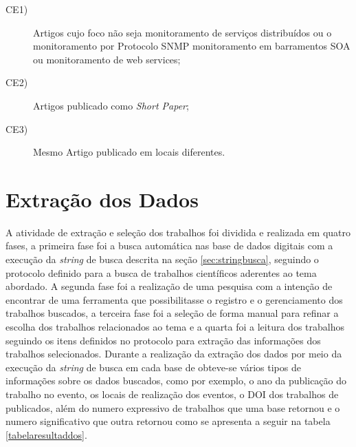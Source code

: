 \begin{description}
\item[CE1)]Artigos cujo foco não seja monitoramento de serviços distribuídos ou o monitoramento por Protocolo SNMP monitoramento em barramentos SOA ou monitoramento de web services;
\item[CE2)] Artigos publicado como \textit{Short Paper};
\item[CE3)] Mesmo Artigo publicado em locais diferentes.
\end{description}


\section{Extração dos Dados}
A atividade de extração e seleção dos trabalhos foi dividida e realizada em quatro fases, a primeira fase foi a busca automática nas base de dados digitais com a execução da \textit{string} de busca descrita na seção \ref{sec:stringbusca}, seguindo o protocolo definido para a busca de trabalhos científicos aderentes ao tema abordado. A segunda fase foi a realização de uma pesquisa com a intenção de encontrar de uma ferramenta que possibilitasse o registro e o gerenciamento dos trabalhos buscados, a terceira fase foi a seleção de forma manual para refinar a escolha dos trabalhos relacionados ao tema e a quarta foi a leitura dos trabalhos seguindo os itens definidos no protocolo para extração das informações dos trabalhos selecionados. Durante a realização da extração dos dados por meio da execução da \textit{string} de busca em cada base de obteve-se vários tipos de informações sobre os dados buscados, como por exemplo, o ano da publicação do trabalho no evento, os locais de realização dos eventos, o \acrshort{DOI} dos trabalhos de publicados, além do numero expressivo de trabalhos que uma base retornou e o numero significativo que outra retornou como se apresenta a seguir na tabela \ref{tabelaresultaddos}.

